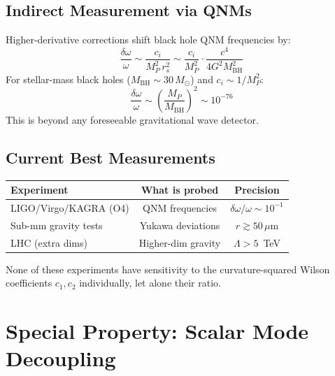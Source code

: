 \documentclass[11pt,a4paper]{article}
\begin{document}
\subsection{Indirect Measurement via QNMs}

Higher-derivative corrections shift black hole QNM frequencies by:
\begin{equation}
  \frac{\delta\omega}{\omega} \sim \frac{c_i}{M_P^2\,r_s^2} \sim \frac{c_i}{M_P^2}\cdot\frac{c^4}{4G^2 M_{\text{BH}}^2}
\end{equation}
For stellar-mass black holes ($M_{\text{BH}} \sim 30\,M_\odot$) and $c_i \sim 1/M_P^2$:
\begin{equation}
  \frac{\delta\omega}{\omega} \sim \left(\frac{M_P}{M_{\text{BH}}}\right)^2 \sim 10^{-76}
\end{equation}
This is beyond any foreseeable gravitational wave detector.

\subsection{Current Best Measurements}

\begin{center}
\renewcommand{\arraystretch}{1.2}
\begin{tabular}{lcc}
  \toprule
  \textbf{Experiment} & \textbf{What is probed} & \textbf{Precision} \\
  \midrule
  LIGO/Virgo/KAGRA (O4) & QNM frequencies & $\delta\omega/\omega \sim 10^{-1}$ \\
  Sub-mm gravity tests & Yukawa deviations & $r \gtrsim 50\,\mu$m \\
  LHC (extra dims) & Higher-dim gravity & $\Lambda > 5$~TeV \\
  \bottomrule
\end{tabular}
\end{center}

\noindent
None of these experiments have sensitivity to the curvature-squared Wilson coefficients $c_1, c_2$ individually, let alone their ratio.

\section{Special Property: Scalar Mode Decoupling}
\end{document}
